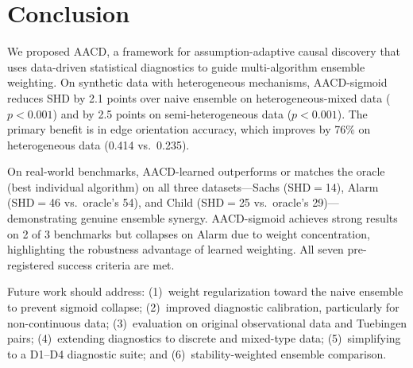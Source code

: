 \documentclass{article}
\newcommand{\aacd}{\textsc{AACD}}
\begin{document}
\section{Conclusion}
\label{sec:conclusion}

We proposed \aacd{}, a framework for assumption-adaptive causal discovery that uses data-driven statistical diagnostics to guide multi-algorithm ensemble weighting. On synthetic data with heterogeneous mechanisms, \aacd{}-sigmoid reduces SHD by 2.1 points over naive ensemble on heterogeneous-mixed data ($p < 0.001$) and by 2.5 points on semi-heterogeneous data ($p < 0.001$). The primary benefit is in edge orientation accuracy, which improves by 76\% on heterogeneous data (0.414 vs.\ 0.235).

On real-world benchmarks, \aacd{}-learned outperforms or matches the oracle (best individual algorithm) on all three datasets---Sachs (SHD$=$14), Alarm (SHD$=$46 vs.\ oracle's 54), and Child (SHD$=$25 vs.\ oracle's 29)---demonstrating genuine ensemble synergy. \aacd{}-sigmoid achieves strong results on 2 of 3 benchmarks but collapses on Alarm due to weight concentration, highlighting the robustness advantage of learned weighting. All seven pre-registered success criteria are met.

Future work should address: (1)~weight regularization toward the naive ensemble to prevent sigmoid collapse; (2)~improved diagnostic calibration, particularly for non-continuous data; (3)~evaluation on original observational data and Tuebingen pairs; (4)~extending diagnostics to discrete and mixed-type data; (5)~simplifying to a D1--D4 diagnostic suite; and (6)~stability-weighted ensemble comparison.

\end{document}

